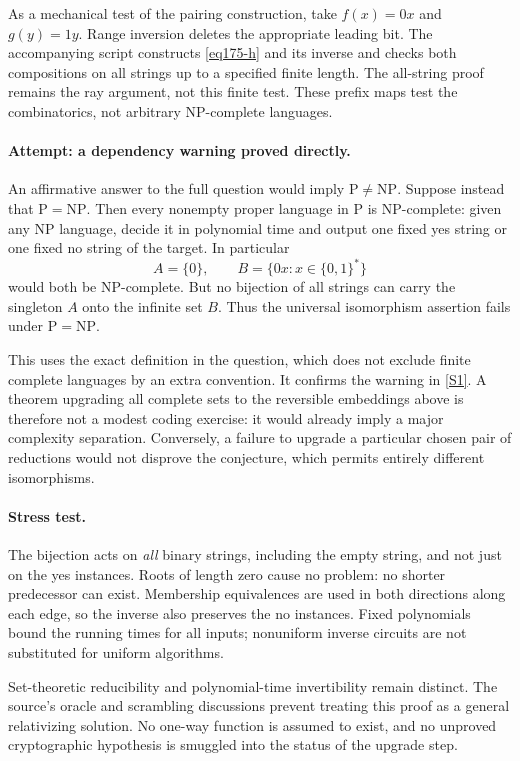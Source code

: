 \documentclass[11pt,a4paper]{article}
\newcommand{\sref}[2]{\hyperlink{source:#1:#2}{[S#2]}}
\numberwithin{equation}{section}
\begin{document}
As a mechanical test of the pairing construction, take $f(x)=0x$ and
$g(y)=1y$. Range inversion deletes the appropriate leading bit. The
accompanying script constructs \eqref{eq175-h} and its inverse and checks
both compositions on all strings up to a specified finite length. The
all-string proof remains the ray argument, not this finite test. These
prefix maps test the combinatorics, not arbitrary NP-complete languages.

\paragraph{Attempt: a dependency warning proved directly.}
An affirmative answer to the full question would imply
$\mathrm P\ne\mathrm{NP}$. Suppose instead that $\mathrm P=\mathrm{NP}$.
Then every nonempty proper language in $\mathrm P$ is NP-complete: given
any NP language, decide it in polynomial time and output one fixed yes
string or one fixed no string of the target. In particular
\[
 A=\{0\},\qquad B=\{0x:x\in\{0,1\}^*\}
\]
would both be NP-complete. But no bijection of all strings can carry the
singleton $A$ onto the infinite set $B$. Thus the universal isomorphism
assertion fails under $\mathrm P=\mathrm{NP}$.

This uses the exact definition in the question, which does not exclude
finite complete languages by an extra convention. It confirms the
warning in \sref{statement}{1}. A theorem upgrading all complete sets to the
reversible embeddings above is therefore not a modest coding exercise:
it would already imply a major complexity separation. Conversely, a
failure to upgrade a particular chosen pair of reductions would not
disprove the conjecture, which permits entirely different isomorphisms.

\paragraph{Stress test.}
The bijection acts on \emph{all} binary strings, including the empty string,
and not just on the yes instances. Roots of length zero cause no problem:
no shorter predecessor can exist. Membership equivalences are used in
both directions along each edge, so the inverse also preserves the no
instances. Fixed polynomials bound the running times for all inputs;
nonuniform inverse circuits are not substituted for uniform algorithms.

Set-theoretic reducibility and polynomial-time invertibility remain distinct.
The source's oracle and scrambling discussions prevent treating this proof
as a general relativizing solution. No one-way function is assumed to exist,
and no unproved cryptographic hypothesis is smuggled into the status of
the upgrade step.
\end{document}
